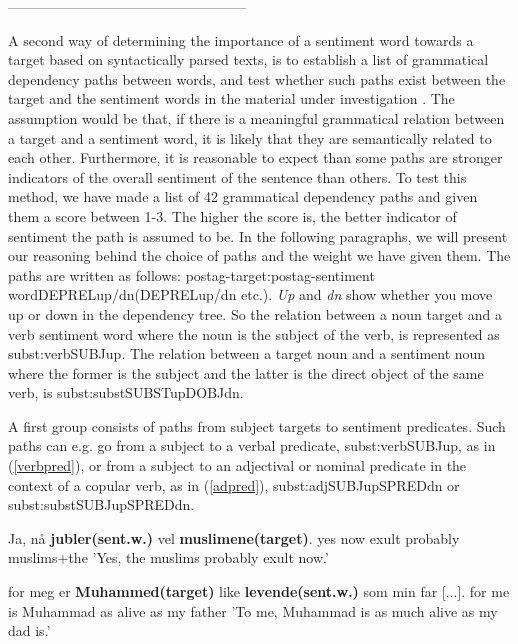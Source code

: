 \documentclass[11pt]{article}
\begin{document}
---------------------------------------------------
	
A second way of determining the importance of a sentiment word towards a target based on syntactically parsed texts, is to establish a list of grammatical dependency paths between words, and test whether such paths exist between the target and the sentiment words in the material under investigation \cite{Jiang11}. The assumption would be that, if there is a meaningful grammatical relation between a target and a sentiment word, it is likely that they are semantically related to each other. Furthermore, it is reasonable to expect than some paths are stronger indicators of the overall sentiment of the sentence than others. To test this method, we have made a list of 42 grammatical dependency paths and given them a score between 1-3. The higher the score is, the better indicator of sentiment the path is assumed to be. In the following paragraphs, we will present our reasoning behind the choice of paths and the weight we have given them. The paths are written as follows: postag-target:postag-sentiment word{\textunderscore}{\textunderscore}DEPREL{\textunderscore}up/dn({\textunderscore}{\textunderscore}DEPREL{\textunderscore}up/dn etc.). \emph{Up} and \emph{dn} show whether you move up or down in the dependency tree. So the relation between a noun target and a verb sentiment word where the noun is the subject of the verb, is represented as subst:verb{\textunderscore}{\textunderscore}SUBJ{\textunderscore}up. The relation between a target noun and a sentiment noun where the former is the subject and the latter is the direct object of the same verb, is subst:subst{\textunderscore}{\textunderscore}SUBST{\textunderscore}up{\textunderscore}{\textunderscore}DOBJ{\textunderscore}dn.
	
	A first group consists of paths from subject targets to sentiment predicates. Such paths can e.g. go from a subject to a verbal predicate, subst:verb{\textunderscore}{\textunderscore}SUBJ{\textunderscore}up, as in (\ref{verbpred}), or from a subject to an adjectival or nominal predicate in the context of a copular verb, as in (\ref{adpred}), subst:adj{\textunderscore}{\textunderscore}SUBJ{\textunderscore}up{\textunderscore}{\textunderscore}SPRED{\textunderscore}dn or subst:subst{\textunderscore}{\textunderscore}SUBJ{\textunderscore}up{\textunderscore}{\textunderscore}SPRED{\textunderscore}dn.
	
	\begin{examples}
	\item\label{verbpred}
	\gll Ja, n{\aa} \textbf{jubler(sent.w.)} vel \textbf{muslimene(target)}.
	yes now exult probably muslims+the
	\glt 'Yes, the muslims probably exult now.'
	\glend
	
	\item\label{adpred}
	\gll [...] for meg er \textbf{Muhammed(target)} like \textbf{levende(sent.w.)} som min far [...].
	{} for me is Muhammad as alive as my father {}
	\glt 'To me, Muhammad is as much alive as my dad is.'
	\glend
	
	\end{examples}
	
\end{document}
